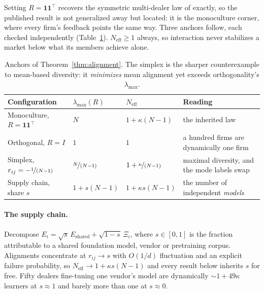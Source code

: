 \documentclass{article}
\theoremstyle{plain}
\theoremstyle{definition}
\newcommand{\Neff}{N_{\mathrm{eff}}}
\newcommand{\lmax}{\lambda_{\max}}
\begin{document}
Setting $R = \mathbf{1}\mathbf{1}^{\top}$ recovers the symmetric multi-dealer law of \citet{reflex2026} exactly, so the published result is not generalized away but located: it is the monoculture corner, where every firm's feedback points the same way. Three anchors follow, each checked independently (Table~\ref{tab:anchors}). $\Neff \geq 1$ always, so interaction never stabilizes a market below what its members achieve alone.

\begin{table}[t]
\centering
\caption{Anchors of Theorem~\ref{thm:alignment}. The simplex is the sharper counterexample to mean-based diversity: it \emph{minimizes} mean alignment yet exceeds orthogonality's $\lmax$.}
\label{tab:anchors}
\small
\begin{tabular}{llll}
\toprule
Configuration & $\lmax(R)$ & $\Neff$ & Reading \\
\midrule
Monoculture, $R=\mathbf{1}\mathbf{1}^{\top}$ & $N$ & $1+\kappa(N-1)$ & the inherited law \\
Orthogonal, $R=I$ & $1$ & $1$ & a hundred firms are dynamically one firm \\
Simplex, $r_{ij}=-\nicefrac{1}{(N-1)}$ & $\nicefrac{N}{(N-1)}$ & $1+\nicefrac{\kappa}{(N-1)}$ & maximal diversity, and the mode labels swap \\
Supply chain, share $s$ & $1+s(N-1)$ & $1+\kappa s(N-1)$ & the number of independent \emph{models} \\
\bottomrule
\end{tabular}
\end{table}

\paragraph{The supply chain.}
Decompose $E_i = \sqrt{s}\,E_{\text{shared}} + \sqrt{1-s}\,\Xi_i$, where $s\in[0,1]$ is the fraction attributable to a shared foundation model, vendor or pretraining corpus. Alignments concentrate at $r_{ij}\to s$ with $O(1/d)$ fluctuation and an explicit failure probability, so $\Neff \to 1 + \kappa s (N-1)$ and every result below inherits $s$ for free. Fifty dealers fine-tuning one vendor's model are dynamically ${\sim}1+49\kappa$ learners at $s\approx 1$ and barely more than one at $s \approx 0$.
\end{document}
